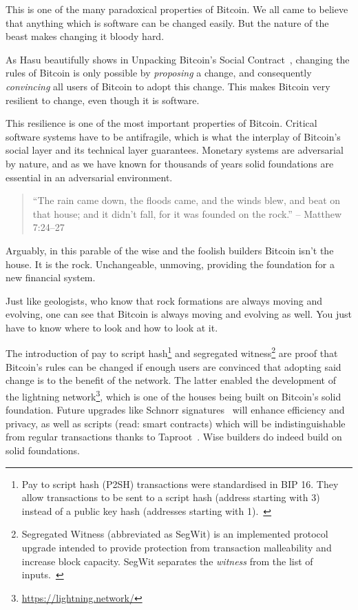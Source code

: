 This is one of the many paradoxical properties of Bitcoin. We all came
to believe that anything which is software can be changed easily. But
the nature of the beast makes changing it bloody hard.

As Hasu beautifully shows in Unpacking Bitcoin's Social
Contract~\cite{social-contract}, changing the rules of Bitcoin is only possible
by \textit{proposing} a change, and consequently \textit{convincing} all users
of Bitcoin to adopt this change. This makes Bitcoin very resilient to change,
even though it is software.

This resilience is one of the most important properties of Bitcoin.
Critical software systems have to be antifragile, which is what the
interplay of Bitcoin's social layer and its technical layer guarantees.
Monetary systems are adversarial by nature, and as we have known for
thousands of years solid foundations are essential in an adversarial
environment.

\begin{samepage}\begin{quotation}
``The rain came down, the floods came, and the winds blew, and beat on
that house; and it didn't fall, for it was founded on the rock.''
\flushright -- Matthew 7:24--27
\end{quotation}\end{samepage}

Arguably, in this parable of the wise and the foolish builders Bitcoin
isn't the house. It is the rock. Unchangeable, unmoving, providing the
foundation for a new financial system.

Just like geologists, who know that rock formations are always moving
and evolving, one can see that Bitcoin is always moving and evolving as
well. You just have to know where to look and how to look at it.

The introduction of pay to script hash\footnote{ Pay to script hash (P2SH)
transactions were standardised in BIP 16. They allow transactions to be sent to
a script hash (address starting with 3) instead of a public key hash (addresses
starting with 1).~\cite{btcwiki:p2sh}} and segregated
witness\footnote{Segregated Witness (abbreviated as SegWit) is an implemented
protocol upgrade intended to provide protection from transaction malleability
and increase block capacity. SegWit separates the \textit{witness} from the list
of inputs.~\cite{btcwiki:segwit}} are proof that Bitcoin's rules can be changed
if enough users are convinced that adopting said change is to the benefit of the
network. The latter enabled the development of the lightning
network\footnote{\url{https://lightning.network/}}, which is one of the houses
being built on Bitcoin's solid foundation. Future upgrades like Schnorr
signatures~\cite{bip:schnorr} will enhance efficiency and privacy, as well as
scripts (read: smart contracts) which will be indistinguishable from regular
transactions thanks to Taproot~\cite{taproot}. Wise builders do indeed build on
solid foundations.

